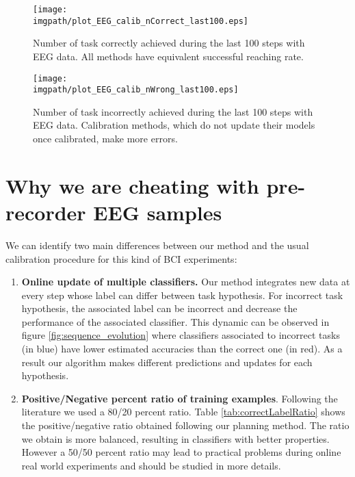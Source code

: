 \begin{figure}[!htbp]
\centering
\texttt{[image: \\imgpath/plot\_EEG\_calib\_nCorrect\_last100.eps]}
\caption{Number of task correctly achieved during the last 100 steps with EEG data. All methods have equivalent successful reaching rate.}
\label{fig:nCorrectEEG_last100}
\end{figure} 

\begin{figure}[!htbp]
\centering
\texttt{[image: \\imgpath/plot\_EEG\_calib\_nWrong\_last100.eps]}
\caption{Number of task incorrectly achieved during the last 100 steps with EEG data. Calibration methods, which do not update their models once calibrated, make more errors.}
\label{fig:nWrongEEG_last100}
\end{figure} 

\section{Why we are cheating with pre-recorder EEG samples}
\label{chapter:bci:cheating}

We can identify two main differences between our method and the usual calibration procedure for this kind of BCI experiments:
\begin{enumerate}
\item \textbf{Online update of multiple classifiers.} Our method integrates new data at every step whose label can differ between task hypothesis. For incorrect task hypothesis, the associated label can be incorrect and decrease the performance of the associated classifier. This dynamic can be observed in figure \ref{fig:sequence_evolution} where classifiers associated to incorrect tasks (in blue) have lower estimated accuracies than the correct one (in red). As a result our algorithm makes different predictions and updates for each hypothesis.
\item \textbf{Positive/Negative percent ratio of training examples}. Following the literature \cite{chavarriaga2010learning, iturrate2013task} we used a 80/20 percent ratio. Table \ref{tab:correctLabelRatio} shows the positive/negative ratio obtained following our planning method. The ratio we obtain is more balanced, resulting in classifiers with better properties. However a 50/50 percent ratio may lead to practical problems during online real world experiments and should be studied in more details.
\end{enumerate}

